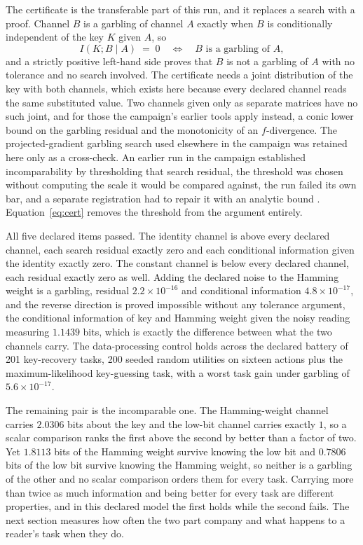 \documentclass[aps,pre,reprint,nofootinbib]{revtex4-2}
\begin{document}
The certificate is the transferable part of this run, and it replaces
a search with a proof.  Channel $B$ is a garbling of channel $A$
exactly when $B$ is conditionally independent of the key $K$ given
$A$, so
\begin{equation}
  I(K; B \mid A) \;=\; 0
  \quad\Longleftrightarrow\quad
  B \text{ is a garbling of } A,
  \label{eq:cert}
\end{equation}
and a strictly positive left-hand side proves that $B$ is not a
garbling of $A$ with no tolerance and no search involved.  The
certificate needs a joint distribution of the key with both channels,
which exists here because every declared channel reads the same
substituted value.  Two channels given only as separate matrices have
no such joint, and for those the campaign's earlier tools apply
instead, a conic lower bound on the garbling residual and the
monotonicity of an $f$-divergence.  The
projected-gradient garbling search used elsewhere in the campaign was
retained here only as a cross-check.  An earlier run in the campaign
established incomparability by thresholding that search residual, the
threshold was chosen without computing the scale it would be compared
against, the run failed its own bar, and a separate registration had
to repair it with an analytic bound \cite{GamesPaper}.
Equation~\eqref{eq:cert} removes the threshold from the argument
entirely.

All five declared items passed.  The identity channel is above every
declared channel, each search residual exactly zero and each
conditional information given the identity exactly zero.
The constant channel is below every declared channel, each residual
exactly zero as well.  Adding the
declared noise to the Hamming weight is a garbling, residual
$2.2 \times 10^{-16}$ and conditional information
$4.8 \times 10^{-17}$, and the reverse direction is proved impossible
without any tolerance argument, the conditional information of key and
Hamming weight given the noisy reading measuring $1.1439$ bits, which
is exactly the difference between what the two channels carry.  The
data-processing control holds across the declared battery of 201
key-recovery tasks, 200 seeded random utilities on sixteen actions
plus the maximum-likelihood key-guessing task, with a worst task gain
under garbling of $5.6 \times 10^{-17}$.

The remaining pair is the incomparable one.  The Hamming-weight
channel carries $2.0306$ bits about the key and the low-bit channel
carries exactly $1$, so a scalar comparison ranks the first above the
second by better than a factor of two.  Yet $1.8113$ bits of the
Hamming weight survive knowing the low bit and $0.7806$ bits of the
low bit survive knowing the Hamming weight, so neither is a garbling
of the other and no scalar comparison orders them for every task.
Carrying more than twice as much information and being better for
every task are different properties, and in this declared model the
first holds while the second fails.  The next section measures how often the two
part company and what happens to a reader's task when they do.
\end{document}
